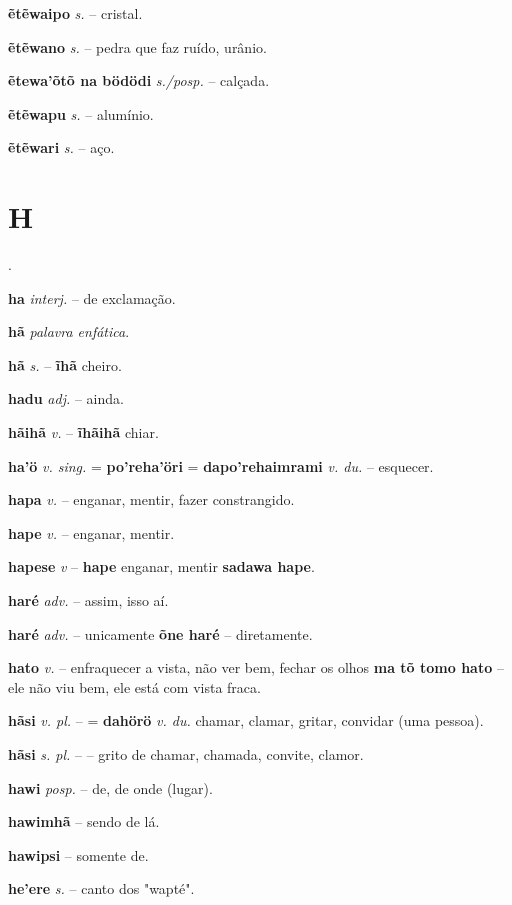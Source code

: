 \textbf{ẽtẽwaipo} \textit{s.} -- cristal.

\textbf{ẽtẽwano} \textit{s.} -- pedra que faz ruído, urânio.

\textbf{ẽtewa'õtõ na bödödi} \textit{s./posp.} -- calçada.

\textbf{ẽtẽwapu} \textit{s.} -- alumínio.

\textbf{ẽtẽwari} \textit{s.} -- aço.


\section*{H}.



\textbf{ha} \textit{interj.} -- de exclamação.

\textbf{hã} \textit{palavra enfática}.

\textbf{hã} \textit{s.} -- \textbf{ĩhã} cheiro.

\textbf{hadu} \textit{adj.} -- ainda.

\textbf{hãihã} \textit{v.} -- \textbf{ĩhãihã} chiar.

\textbf{ha'ö} \textit{v. sing.} = \textbf{po'reha'öri} = \textbf{dapo'rehaimrami} \textit{v. du.} -- esquecer.

\textbf{hapa} \textit{v.} -- enganar, mentir, fazer constrangido.

\textbf{hape} \textit{v.} -- enganar, mentir.

\textbf{hapese} \textit{v} -- \textbf{hape} enganar, mentir  \textbf{sadawa hape}.

\textbf{haré} \textit{adv.} -- assim, isso aí.

\textbf{haré} \textit{adv.} -- unicamente  \textbf{õne haré} -- diretamente.

\textbf{hato} \textit{v.} -- enfraquecer a vista, não ver bem, fechar os olhos  \textbf{ma tõ tomo hato} -- ele não viu bem, ele está com vista fraca.

\textbf{hãsi} \textit{v. pl.} -- = \textbf{dahörö} \textit{v. du.} chamar, clamar, gritar, convidar (uma pessoa).

\textbf{hãsi} \textit{s. pl.} -- -- grito de chamar, chamada, convite, clamor.

\textbf{hawi} \textit{posp.} -- de, de onde (lugar).

\textbf{hawimhã} -- sendo de lá.

\textbf{hawipsi} -- somente de.

\textbf{he'ere} \textit{s.} -- canto dos "wapté".

